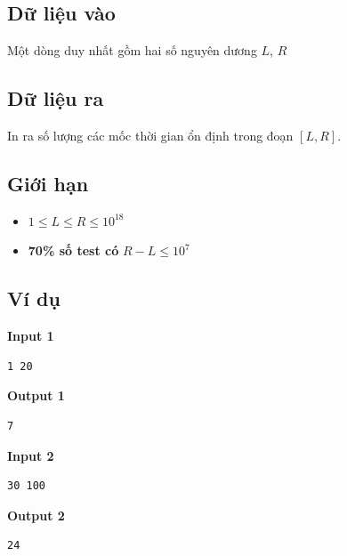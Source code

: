 \subsection*{Dữ liệu vào}

Một dòng duy nhất gồm hai số nguyên dương $L$, $R$


\subsection*{Dữ liệu ra}

In ra số lượng các mốc thời gian ổn định trong đoạn $[L, R]$.

\subsection*{Giới hạn}

\begin{itemize}
    \item $1 \le L \le R \le 10^{18}$
    \item \textbf{70\% số test có} $R - L \le 10^7$
\end{itemize}

\subsection*{Ví dụ}

\noindent
\begin{minipage}[t]{0.48\textwidth}
\textbf{Input 1}
\begin{verbatim}
1 20
\end{verbatim}
\end{minipage}
\hfill
\begin{minipage}[t]{0.48\textwidth}
\textbf{Output 1}
\begin{verbatim}
7
\end{verbatim}
\end{minipage}

\vspace{1em}

\noindent
\begin{minipage}[t]{0.48\textwidth}
\textbf{Input 2}
\begin{verbatim}
30 100
\end{verbatim}
\end{minipage}
\hfill
\begin{minipage}[t]{0.48\textwidth}
\textbf{Output 2}
\begin{verbatim}
24
\end{verbatim}
\end{minipage}

